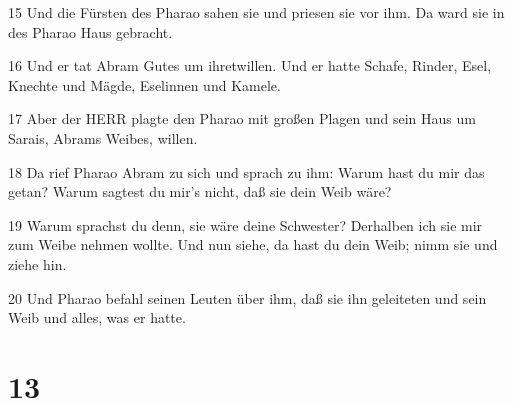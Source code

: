 \par 15 Und die Fürsten des Pharao sahen sie und priesen sie vor ihm. Da ward sie in des Pharao Haus gebracht.
\par 16 Und er tat Abram Gutes um ihretwillen. Und er hatte Schafe, Rinder, Esel, Knechte und Mägde, Eselinnen und Kamele.
\par 17 Aber der HERR plagte den Pharao mit großen Plagen und sein Haus um Sarais, Abrams Weibes, willen.
\par 18 Da rief Pharao Abram zu sich und sprach zu ihm: Warum hast du mir das getan? Warum sagtest du mir's nicht, daß sie dein Weib wäre?
\par 19 Warum sprachst du denn, sie wäre deine Schwester? Derhalben ich sie mir zum Weibe nehmen wollte. Und nun siehe, da hast du dein Weib; nimm sie und ziehe hin.
\par 20 Und Pharao befahl seinen Leuten über ihm, daß sie ihn geleiteten und sein Weib und alles, was er hatte.

\chapter{13}

